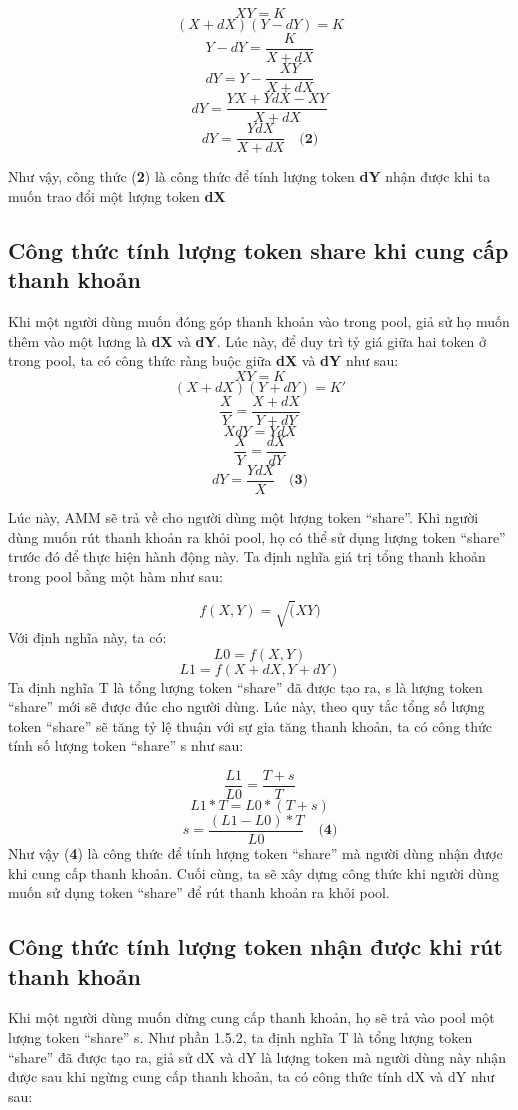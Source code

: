 \[XY = K \]
\[(X + dX)(Y - dY) = K \]
\[Y - dY = \frac{K}{X + dX} \]
\[dY = Y - \frac{XY}{X+dX} \]
\[dY = \frac{YX + YdX - XY}{X+dX}\]
\[dY = \frac{YdX}{X + dX}\quad \textbf{(2)} \]

\newpage

\hspace{-1cm}Như vậy, công thức (\textbf{2}) là công thức để tính lượng token
\textbf{dY} nhận được khi ta muốn trao đổi một lượng token \textbf{dX}

\subsection{Công thức tính lượng token share khi cung cấp thanh khoản}
\hspace{1cm}Khi một người dùng muốn đóng góp thanh khoản vào trong pool, giả sử
họ muốn thêm vào một lương là \textbf{dX} và \textbf{dY}. Lúc này, để duy trì
tỷ giá giữa hai token ở trong pool, ta có công thức ràng buộc giữa \textbf{dX}
và \textbf{dY} như sau:
\[XY = K \]
\[(X + dX)(Y + dY) = K' \]
\[\frac{X}{Y} = \frac{X + dX}{Y + dY} \]
\[{XdY} = {YdX} \]
\[\frac{X}{Y} = \frac{dX}{dY}\]
\[dY = \frac{YdX}{X}\quad \textbf{(3)} \]

\hspace{-1cm}Lúc này, AMM sẽ trả về cho người dùng một lượng token “share”. Khi
người dùng muốn rút thanh khoản ra khỏi pool, họ có thể sử dụng lượng token
“share” trước đó để thực hiện hành động này. Ta định nghĩa giá trị tổng thanh
khoản trong pool bằng một hàm như sau:

\[f(X,Y) = \sqrt(XY)\]
Với định nghĩa này, ta có:
\[L0 = f(X,Y)\]
\[L1 = f(X+dX, Y+dY)\]
Ta định nghĩa T là tổng lượng token “share” đã được tạo ra, s là lượng token
“share” mới sẽ được đúc cho người dùng. Lúc này, theo quy tắc tổng số lượng
token “share” sẽ tăng tỷ lệ thuận với sự gia tăng thanh khoản, ta có công thức
tính số lượng token “share” s như sau:

\[\frac{L1}{L0} = \frac{T + s}{T}\]
\[L1 * T = L0 * (T + s)\]
\[s = \frac{(L1 - L0) * T}{L0} \quad \textbf{(4)}\]
Như vậy (\textbf{4}) là công thức để tính lượng token “share” mà người dùng
nhận được khi cung cấp thanh khoản. Cuối cùng, ta sẽ xây dựng công thức khi
người dùng muốn sử dụng token “share” để rút thanh khoản ra khỏi pool.

\subsection{Công thức tính lượng token nhận được khi rút thanh khoản}
\hspace{1cm}Khi một người dùng muốn dừng cung cấp thanh khoản, họ sẽ trả vào
pool một lượng token “share” s. Như phần 1.5.2, ta định nghĩa T là tổng lượng
token “share” đã được tạo ra, giả sử dX và dY là lượng token mà người dùng này
nhận được sau khi ngừng cung cấp thanh khoản, ta có công thức tính dX và dY như
sau:

